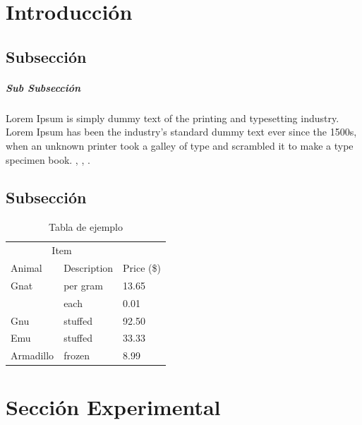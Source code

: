\documentclass[11pt,fleqn]{article} %
\begin{document}
	\begin{multicols}{2}
		\setlength{\parindent}{0.5cm} %
				
		\section{Introducción} 
		
		\subsection{Subsección}
		
		\subparagraph{Sub Subsección}Lorem Ipsum is simply dummy text of the printing and typesetting industry. Lorem Ipsum has been the industry's standard dummy text ever since the 1500s, when an unknown printer took a galley of type and scrambled it to make a type specimen book. \cite{article}, \cite{1}, \cite{book}. 
				
		\subsection{Subsección}
		
		\begin{table}[H]
			\centering
			\caption{Tabla de ejemplo}
			\label{Tabla_1}
			\begin{tabularx}{0.5\textwidth}{X X X} 
				\toprule %
				\multicolumn{2}{c}{Item} & \\ 
				\cmidrule(r){1-2} %
				Animal & Description & Price (\$)\\ 
				\midrule %
				Gnat & per gram & 13.65 \\
				& each & 0.01 \\
				Gnu & stuffed & 92.50 \\
				Emu & stuffed & 33.33 \\
				Armadillo & frozen & 8.99 \\ 
				\bottomrule %
			\end{tabularx}			
		\end{table}
		
		\section{Sección Experimental} 
		

\end{multicols}
\end{document}
